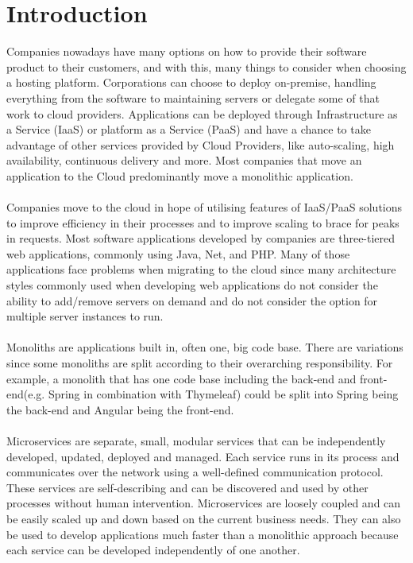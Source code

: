 \documentclass[BIF,Master,nenglish]{twbook}
\begin{document}
\maketitle

%
%
\chapter{Introduction}
Companies nowadays have many options on how to provide their software product to their customers, and with this, many things to consider when choosing a hosting platform. Corporations can choose to deploy on-premise, handling everything from the software to maintaining servers or delegate some of that work to cloud providers. Applications can be deployed through Infrastructure as a Service (IaaS)\cite{microIaas} or platform as a Service (PaaS)\cite{redPaas} and have a chance to take advantage of other services provided by Cloud Providers, like auto-scaling, high availability, continuous delivery and more. Most companies that move an application to the Cloud predominantly move a monolithic application.
\\
\\
Companies move to the cloud in hope of utilising features of IaaS/PaaS solutions to improve efficiency in their processes and to improve scaling to brace for peaks in requests. Most software applications developed by companies are three-tiered web applications, commonly using Java, Net, and PHP. Many of those applications face problems when migrating to the cloud since many architecture styles commonly used when developing web applications do not consider the ability to add/remove servers on demand and do not consider the option for multiple server instances to run.
\\
\\
Monoliths are applications built in, often one, big code base. There are variations since some monoliths are split according to their overarching responsibility. For example, a monolith that has one code base including the back-end and front-end(e.g. Spring in combination with Thymeleaf) could be split into Spring being the back-end and Angular being the front-end.
\\
\\
Microservices are separate, small, modular services that can be independently developed, updated, deployed and managed. Each service runs in its process and communicates over the network using a well-defined communication protocol. These services are self-describing and can be discovered and used by other processes without human intervention. Microservices are loosely coupled and can be easily scaled up and down based on the current business needs. They can also be used to develop applications much faster than a monolithic approach because each service can be developed independently of one another\cite{ade2017}.
\end{document}
